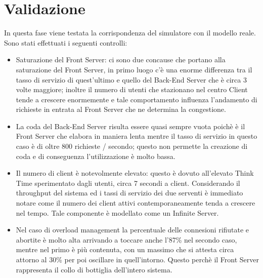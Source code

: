\chapter{Validazione} 

In questa fase viene testata la corrispondenza del simulatore con il modello reale. Sono stati effettuati i seguenti controlli:

\begin{itemize}
 \item Saturazione del Front Server: ci sono due concause che portano alla saturazione del Front Server, in primo luogo c'è una enorme differenza tra il tasso di servizio di quest'ultimo e quello del Back-End Server che è circa 3 volte maggiore; inoltre il numero di utenti che stazionano nel centro Client tende a crescere enormemente e tale comportamento influenza l'andamento di richieste in entrata al Front Server che ne determina la congestione.
 
 \item La coda del Back-End Server risulta essere quasi sempre vuota poichè è il Front Server che elabora in maniera lenta mentre il tasso di servizio in questo caso è di oltre 800 richieste / secondo; questo non permette la creazione di coda e di conseguenza l'utilizzazione è molto bassa.
 
 \item Il numero di client è notevolmente elevato: questo è dovuto all'elevato Think Time sperimentato dagli utenti, circa 7 secondi a client. Considerando il throughput del sistema ed i tassi di servizio dei due serventi è immediato notare come il numero dei client attivi contemporaneamente tenda a crescere nel tempo. Tale componente è modellato come un Infinite Server.
 
 \item Nel caso di overload management la percentuale delle connesioni rifiutate e abortite è molto alta arrivando a toccare anche l'87\% nel secondo caso, mentre nel primo è più contenuta, con un massimo che si attesta circa attorno al 30\% per poi oscillare in quell'intorno. Questo perchè il Front Server rappresenta il collo di bottiglia dell'intero sistema.
\end{itemize}